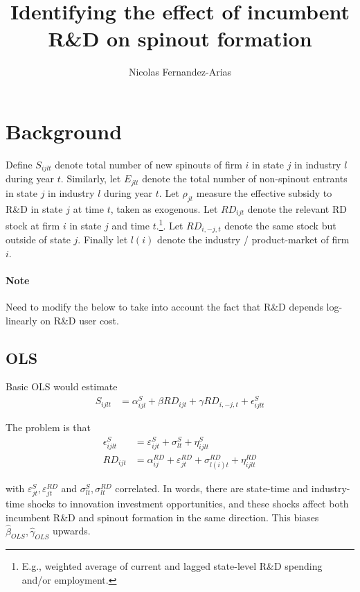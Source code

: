 \documentclass[11pt,english]{article}
\theoremstyle{remark}
\begin{document}
	
\title{Identifying the effect of incumbent R\&D on spinout formation}
\author{Nicolas Fernandez-Arias}
\maketitle

\section{Background}

Define $S_{ijlt}$ denote total number of new spinouts of firm $i$ in state $j$ in industry $l$ during year $t$. Similarly, let $E_{jlt}$ denote the total number of non-spinout entrants in state $j$ in industry $l$ during year $t$. Let $\rho_{jt}$ measure the effective subsidy to R\&D in state $j$ at time $t$, taken as exogenous. Let $RD_{ijt}$ denote the relevant RD stock at firm $i$ in state $j$ and time $t$.\footnote{E.g., weighted average of current and lagged state-level R\&D spending and/or employment.}. Let $RD_{i,-j,t}$ denote the same stock but outside of state $j$. Finally let $l(i)$ denote the industry / product-market of firm $i$. 

\paragraph{Note} Need to modify the below to take into account the fact that R\&D depends log-linearly on R\&D user cost.

\subsection{OLS}

Basic OLS would estimate
\begin{align*}
	S_{ijlt} &= \alpha_{ijl}^S + \beta RD_{ijt} + \gamma RD_{i,-j,t} + \epsilon^S_{ijlt}
\end{align*}

The problem is that 
\begin{align*}
	\epsilon^S_{ijlt} &= \varepsilon^S_{ijt} + \sigma^S_{lt} + \eta^S_{ijlt} \\
	RD_{ijt} &= \alpha_{ij}^{RD} + \varepsilon^{RD}_{jt} + \sigma^{RD}_{l(i)t} + \eta^{RD}_{ijlt}
\end{align*}

with $\varepsilon^S_{jt},\varepsilon^{RD}_{jt}$ and $\sigma^S_{lt},\sigma^{RD}_{lt}$ correlated. In words, there are state-time and industry-time shocks to innovation investment opportunities, and these shocks affect both incumbent R\&D and spinout formation in the same direction. This biases $\hat{\beta}_{OLS},\hat{\gamma}_{OLS}$ upwards.
\end{document}
